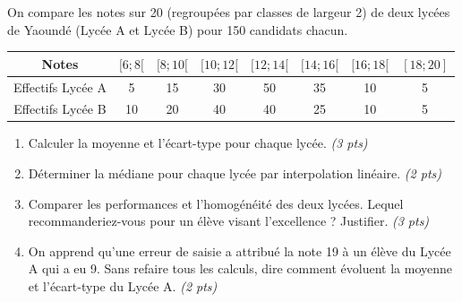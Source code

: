 \documentclass[11pt]{article}
\begin{document}
\begin{exercice}
On compare les notes sur 20 (regroupées par classes de largeur 2) de deux lycées de Yaoundé (Lycée A et Lycée B) pour 150 candidats chacun.
\begin{center}
\begin{tabular}{|c|c|c|c|c|c|c|c|}
\hline
Notes & $[6; 8[$ & $[8; 10[$ & $[10; 12[$ & $[12; 14[$ & $[14; 16[$ & $[16; 18[$ & $[18; 20]$ \\
\hline
Effectifs Lycée A & 5 & 15 & 30 & 50 & 35 & 10 & 5 \\
\hline
Effectifs Lycée B & 10 & 20 & 40 & 40 & 25 & 10 & 5 \\
\hline
\end{tabular}
\end{center}
\begin{enumerate}
    \item Calculer la moyenne et l'écart-type pour chaque lycée. \textit{(3 pts)}
    \item Déterminer la médiane pour chaque lycée par interpolation linéaire. \textit{(2 pts)}
    \item Comparer les performances et l'homogénéité des deux lycées. Lequel recommanderiez-vous pour un élève visant l'excellence ? Justifier. \textit{(3 pts)}
    \item On apprend qu'une erreur de saisie a attribué la note 19 à un élève du Lycée A qui a eu 9. Sans refaire tous les calculs, dire comment évoluent la moyenne et l'écart-type du Lycée A. \textit{(2 pts)}
\end{enumerate}
\end{exercice}
\end{document}
